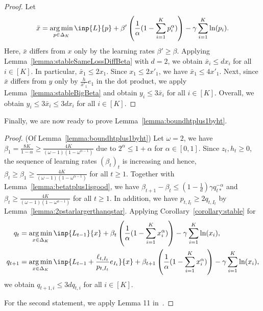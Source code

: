 \begin{proof}
    Let 
    \begin{align*}
        \bar{x} = \argmin_{p \in \Delta_K}\inp{L}{p} + \beta'\left(\frac{1}{\alpha}(1-\sum_{i=1}^K p_i^\alpha)\right) - \gamma\sum_{i=1}^K \ln(p_i).
    \end{align*}
    Here, $\bar{x}$ differs from $x$ only by the learning rates $\beta' \geq \beta$. 
    Applying Lemma~\ref{lemma:stableSameLossDiffBeta} with $d=2$, we obtain $\bar{x}_i \leq dx_i$ for all $i \in [K]$. In particular, $\bar{x}_1 \leq 2x_1$. Since $x_1 \leq 2x'_1$, we have $\bar{x}_1 \leq 4x'_1$.
    Next, since $\bar{x}$ differs from $y$ only by $\frac{h}{x'_1}e_1$ in the dot product, we apply Lemma~\ref{lemma:stableBigBeta} and obtain $y_i \leq 3\bar{x}_i$ for all $i \in [K]$. 
    Overall, we obtain $y_i \leq 3\bar{x}_i \leq 3dx_i$ for all $i \in [K]$.
\end{proof}
Finally, we are now ready to prove Lemma~\ref{lemma:boundhtplus1byht}.
\begin{proof}(Of Lemma~\ref{lemma:boundhtplus1byht})
    Let $\omega = 2$, we have $\beta_1 = \frac{8K}{1-\alpha} \geq \frac{4K}{(\omega-1)(1-\omega^{\alpha-1})}$ due to $2^\alpha \leq 1 + \alpha$ for $\alpha \in [0,1]$. 
    Since $z_t, h_t \geq 0$, the sequence of learning rates $(\beta_t)_t$ is increasing and hence, $\beta_t \geq \beta_1 \geq \frac{4K}{(\omega-1)(1-\omega^{\alpha-1})}$ for all $t \geq 1$.
    Together with Lemma~\ref{lemma:betatplus1isgood}, we have $\beta_{t+1} - \beta_t \leq \left(1 - \frac{1}{d}\right)\gamma q_{t*}^{-\alpha}$ and $\beta_t \geq \frac{4K}{(\omega-1)(1-\omega^{\alpha-1})}$ for all $t \geq 1$.
    In addition, we have $p_{t,I_t} \geq 2q_{t,I_t}$ by Lemma~\ref{lemma:2pstarlargerthanqstar}.
    Applying Corollary~\ref{corollary:stable} for
    \begin{align*}
        q_t &= \argmin_{x \in \Delta_K} \inp{L_{t-1}}{x} + \beta_t\left(\frac{1}{\alpha}(1-\sum_{i=1}^K x_i^\alpha)\right) - \gamma\sum_{i=1}^K \ln(x_i), \\
        q_{t+1} &= \argmin_{x \in \Delta_K}\inp{L_{t-1} + \frac{\ell_{t,I_t}}{p_{t,I_t}}e_{I_t}}{x} + \beta_{t+1}\left(\frac{1}{\alpha}(1-\sum_{i=1}^K x_i^\alpha)\right) - \gamma\sum_{i=1}^K \ln(x_i),
    \end{align*}
    we obtain $q_{t+1,i} \leq 3dq_{t,i}$ for all $i \in [K]$. 
    
    For the second statement, we apply Lemma 11 in~\cite{ItoCOLT2024}.
\end{proof}

